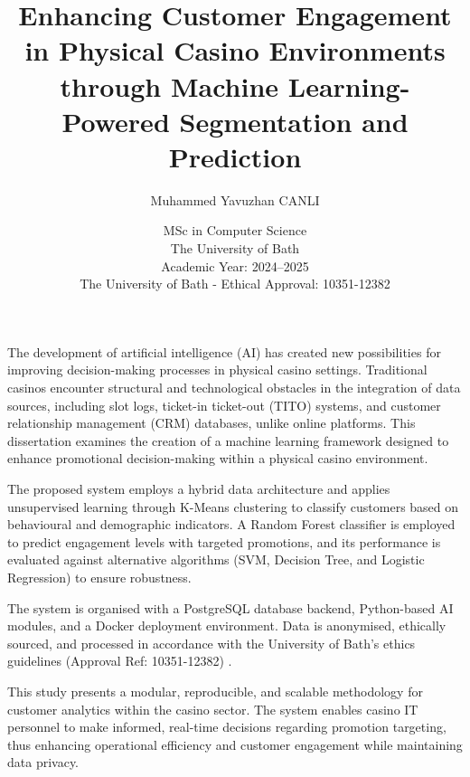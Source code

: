 \documentclass[12pt,a4paper]{report}
\title{\bf Enhancing Customer Engagement in Physical Casino Environments through Machine Learning-Powered Segmentation and Prediction}
\author{Muhammed Yavuzhan CANLI}
\date{MSc in Computer Science\\
      The University of Bath\\
      Academic Year: 2024--2025\\
      \vspace*{5cm}
      The University of Bath - Ethical Approval: 10351-12382}
\begin{document}
\sloppy
\tableofcontents


\hypersetup{pageanchor=false}

\lstset{language=Java,breaklines,breakatwhitespace,basicstyle=\small}

\setcounter{page}{0}

\maketitle
\newpage

\newpage


\newpage

\hypersetup{pageanchor=true}

\abstract
The development of artificial intelligence (AI) has created new possibilities for improving decision-making processes in physical casino settings.  Traditional casinos encounter structural and technological obstacles in the integration of data sources, including slot logs, ticket-in ticket-out (TITO) systems, and customer relationship management (CRM) databases, unlike online platforms.  This dissertation examines the creation of a machine learning framework designed to enhance promotional decision-making within a physical casino environment.

 The proposed system employs a hybrid data architecture and applies unsupervised learning through K-Means clustering to classify customers based on behavioural and demographic indicators.  A Random Forest classifier is employed to predict engagement levels with targeted promotions, and its performance is evaluated against alternative algorithms (SVM, Decision Tree, and Logistic Regression) to ensure robustness.

  The system is organised with a PostgreSQL database backend, Python-based AI modules, and a Docker deployment environment.  Data is anonymised, ethically sourced, and processed in accordance with the University of Bath's ethics guidelines (Approval Ref: 10351-12382) \citep{bathEthics}.

 This study presents a modular, reproducible, and scalable methodology for customer analytics within the casino sector.  The system enables casino IT personnel to make informed, real-time decisions regarding promotion targeting, thus enhancing operational efficiency and customer engagement while maintaining data privacy.
\newpage
\end{document}
